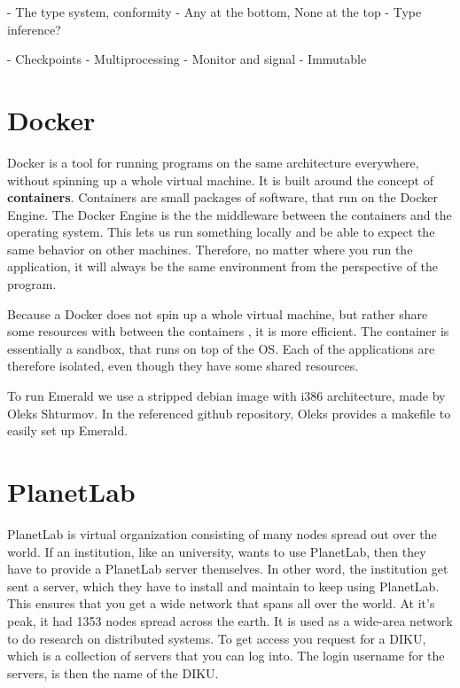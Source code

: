- The type system, conformity
    - Any at the bottom, None at the top
    - Type inference?

- Checkpoints
- Multiprocessing
    - Monitor and signal
- Immutable




\section{Docker}
Docker is a tool for running programs on the same architecture everywhere, without spinning up a whole virtual machine. It is built around the concept of \textbf{containers}. Containers are small packages of software, that run on the Docker Engine. The Docker Engine is the the middleware between the containers and the operating system. This lets us run something locally and be able to expect the same behavior on other machines. Therefore, no matter where you run the application, it will always be the same environment from the perspective of the program. 

Because a Docker does not spin up a whole virtual machine, but rather share some resources with between the containers \cite{dockercom_what_nodate}, it is more efficient. The container is essentially a sandbox, that runs on top of the OS. Each of the applications are therefore isolated, even though they have some shared resources.

To run Emerald we use a stripped debian image with i386 architecture, made by Oleks Shturmov\cite{oleks_oleksdocker-in5570v21_2021}.
In the referenced github repository, Oleks provides a makefile to easily set up Emerald.



\section{PlanetLab}
PlanetLab is virtual organization consisting of many nodes spread out over the world. If an institution, like an university, wants to use PlanetLab, then they have to provide a PlanetLab server themselves. In other word, the institution get sent a server, which they have to install and maintain to keep using PlanetLab. This ensures that you get a wide network that spans all over the world. At it's peak, it had 1353 nodes spread across the earth\cite{noauthor_planetlab_nodate}. It is used as a wide-area network to do research on distributed systems. To get access you request for a DIKU, which is a collection of servers that you can log into. The login username for the servers, is then the name of the DIKU.

